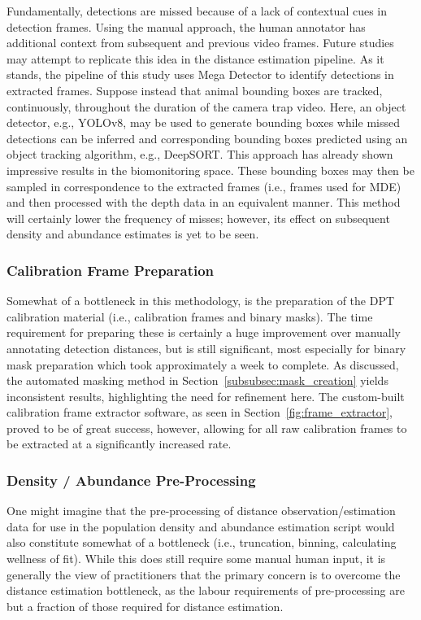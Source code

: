 Fundamentally, detections are missed because of a lack of contextual cues in detection
frames.
Using the manual approach, the human annotator has additional context from subsequent and
previous video frames.
Future studies may attempt to replicate this idea in the distance estimation pipeline.
As it stands, the pipeline of this study uses Mega Detector to identify detections
in extracted frames.
Suppose instead that animal bounding boxes are tracked, continuously, throughout the
duration of the camera trap video.
Here, an object detector, e.g., YOLOv8,\cite{YOLOv8} may be used to generate bounding
boxes while missed detections can be inferred and corresponding bounding boxes predicted
using an object tracking algorithm, e.g., DeepSORT\@.\cite{deepsort}
This approach has already shown impressive results in the biomonitoring space.\cite{detection_pipeline}
These bounding boxes may then be sampled in correspondence to the
extracted frames (i.e., frames used for MDE) and then processed with the depth data in an
equivalent manner.
This method will certainly lower the frequency of misses; however, its effect on subsequent
density and abundance estimates is yet to be seen.

\subsubsection{Calibration Frame Preparation}

Somewhat of a bottleneck in this methodology, is the preparation of the DPT calibration
material (i.e., calibration frames and binary masks).
The time requirement for preparing these is certainly a huge improvement over
manually annotating detection distances, but is still significant, most especially for
binary mask preparation which took approximately a week to complete.
As discussed, the automated masking method in Section~\ref{subsubsec:mask_creation} yields
inconsistent results, highlighting the need for refinement here.
The custom-built calibration frame extractor software, as seen in Section~\ref{fig:frame_extractor},
proved to be of great success, however, allowing for all raw calibration frames to be extracted at a
significantly increased rate.

\subsubsection{Density / Abundance Pre-Processing}

One might imagine that the pre-processing of distance observation/estimation data for use in the population
density and abundance estimation script would also constitute somewhat of a bottleneck (i.e., truncation,
binning, calculating wellness of fit).
While this does still require some manual human input, it is generally the view of practitioners that
the primary concern is to overcome the distance estimation bottleneck, as the labour
requirements of pre-processing are but a fraction of those required for distance estimation.

